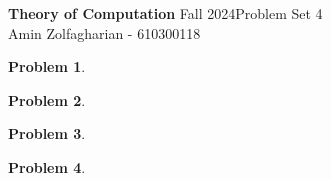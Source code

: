 \documentclass[12pt]{article}
\newcommand{\customanswer}[1]{%
\begin{problem}
\end{problem}

}
\newtheorem{problem}{Problem}
\begin{document}
\noindent \textbf{Theory of Computation} Fall 2024\hfill Problem Set 4\\
Amin Zolfagharian - 610300118

\hrulefill

\customanswer{1}
\customanswer{2}
\customanswer{3}
\customanswer{4}
\end{document}
